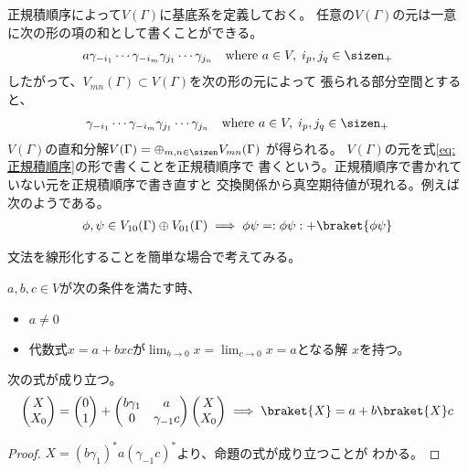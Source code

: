 {	正規積順序によって$V(\Gamma)$に基底系を定義しておく。
	任意の$V(\Gamma)$の元は一意に次の形の項の和として書くことができる。
	\begin{equation}\label{eq:正規積順序}\begin{split}
		a\gamma_{-i_1}\cdots\gamma_{-i_m}\gamma_{j_1}\cdots\gamma_{j_n}
		\quad\text{where } a\in V,\; i_p,j_q\in\sizen_+
	\end{split}\end{equation}
	したがって、$V_{mn}(\Gamma)\subset V(\Gamma)$を次の形の元によって
	張られる部分空間とすると、
	\begin{equation*}\begin{split}
		\gamma_{-i_1}\cdots\gamma_{-i_m}\gamma_{j_1}\cdots\gamma_{j_n}
		\quad\text{where } a\in V,\; i_p,j_q\in\sizen_+
	\end{split}\end{equation*}
	$V(\Gamma)$の直和分解$V(\Gamma)=\oplus_{m,n\in\sizen}V_{mn}(\Gamma)$
	が得られる。
	$V(\Gamma)$の元を式\eqref{eq:正規積順序}の形で書くことを正規積順序で
	書くという。正規積順序で書かれていない元を正規積順序で書き直すと
	交換関係から真空期待値が現れる。例えば次のようである。
	\begin{equation*}\begin{split}
		\phi,\psi\in V_{10}(\Gamma)\oplus V_{01}(\Gamma)
		\implies \phi\psi = :\phi\psi: + \braket{\phi\psi}
	\end{split}\end{equation*}

	文法を線形化することを簡単な場合で考えてみる。

	\begin{observation}[線形な文法]\label{obs:線形な文法} %
		$a,b,c\in V$が次の条件を満たす時、
		\begin{itemize}\setlength{\itemsep}{-1mm} %
			\item $a\neq 0$
			\item 代数式$x=a+bxc$が$\lim_{b\to0}x=\lim_{c\to0}x=a$となる解
			$x$を持つ。
		\end{itemize} %
		次の式が成り立つ。
		\begin{equation*}\begin{split}
			\pvec{X}{X_0} = \pvec{0}{1} + \begin{pmatrix}
				b\gamma_1 & a \\ 0 & \gamma_{-1}c
			\end{pmatrix}\pvec{X}{X_0}
			\implies \braket{X} = a + b\braket{X}c
		\end{split}\end{equation*}
	\end{observation} %
	\begin{proof} %
		$X=(b\gamma_1)^*a(\gamma_{-1}c)^*$より、命題の式が成り立つことが
		わかる。
	\end{proof} %

}
